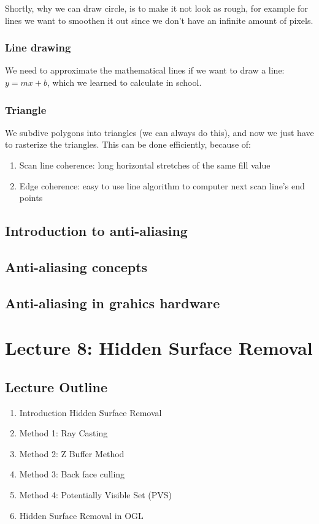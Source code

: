 \documentclass[11pt]{article}
\begin{document}
Shortly, why we can draw circle, is to make it not look as rough, for example for lines we want to smoothen it out since we don't have an infinite amount of pixels.

\subsubsection*{Line drawing}
We need to approximate the mathematical lines if we want to draw a line: $y = mx + b$, which we learned to calculate in school.



\subsubsection*{Triangle}
We subdive polygons into triangles (we can always do this), and now we just have to rasterize the triangles.
This can be done efficiently, because of:
\begin{enumerate}
    \item Scan line coherence: long horizontal stretches of the same fill value
    \item Edge coherence: easy to use line algorithm to computer next scan line's end points
\end{enumerate}


\subsection{Introduction to anti-aliasing}
\subsection{Anti-aliasing concepts}
\subsection{Anti-aliasing in grahics hardware}


\section{Lecture 8: Hidden Surface Removal}
\subsection*{Lecture Outline}
\begin{enumerate}
    \item Introduction Hidden Surface Removal
    \item Method 1: Ray Casting
    \item Method 2: Z Buffer Method
    \item Method 3: Back face culling
    \item Method 4: Potentially Visible Set (PVS)
    \item Hidden Surface Removal in OGL
\end{enumerate}
\end{document}
